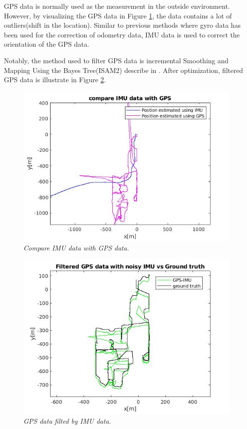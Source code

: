 GPS data is normally used as the measurement in the outside environment. However, by visualizing the GPS data in Figure \ref{fig:IMU-GPS}, the data contains a lot of outliers(shift in the location). Similar to previous methods where gyro data has been used for the correction of odometry data, IMU data is used to correct the orientation of the GPS data.

Notably, the method used to filter GPS data is incremental Smoothing and Mapping Using the Bayes Tree(ISAM2) describe in \cite{5979641}. After optimization, filtered GPS data is illustrate in Figure \ref{fig:filteredgps}.

\begin{figure}[hbt!]
    \centering
    \includegraphics[width = 0.8\linewidth]{media/original-compare.jpg}
    \caption{\textit{Compare IMU data with GPS data.}}
    \label{fig:IMU-GPS}
\end{figure}

\begin{figure}[hbt!]
    \centering
    \includegraphics[width = 0.8\linewidth]{media/filteredfGPS.jpg}
    \caption{\textit{GPS data filted by IMU data.}}
    \label{fig:filteredgps}
\end{figure}